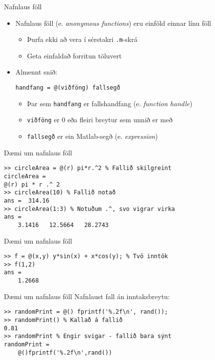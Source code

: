 \documentclass{beamer}
\begin{document}
\begin{frame}[fragile]{Nafnlaus föll}
\begin{itemize}
 \item Nafnlaus föll (e. \emph{anonymous functions}) eru einföld einnar línu föll
 \begin{itemize}
  \item Þurfa ekki að vera í sérstakri \texttt{.m}-skrá
  \item Geta einfaldað forritun töluvert
 \end{itemize}
 \item Almennt snið:
\begin{verbatim}
handfang = @(viðföng) fallsegð
\end{verbatim}
 \begin{itemize}
  \item Þar sem \texttt{handfang} er fallshandfang (e. \emph{function handle})
  \item \texttt{viðföng} er 0 eða fleiri breytur sem unnið er með
  \item \texttt{fallsegð} er ein Matlab-segð (e. \emph{expression})
 \end{itemize}
\end{itemize}
\end{frame}

\begin{frame}[fragile]{Dæmi um nafnlaus föll}
\begin{verbatim}
>> circleArea = @(r) pi*r.^2 % Fallið skilgreint
circleArea =
@(r) pi * r .^ 2
>> circleArea(10) % Fallið notað
ans =  314.16
>> circleArea(1:3) % Notuðum .^, svo vigrar virka
ans =
    3.1416   12.5664   28.2743
\end{verbatim}
\end{frame}

\begin{frame}[fragile]{Dæmi um nafnlaus föll}
\begin{verbatim}
>> f = @(x,y) y*sin(x) + x*cos(y); % Tvö inntök
>> f(1,2)
ans =
    1.2668
\end{verbatim}
\end{frame}

\begin{frame}[fragile]{Dæmi um nafnlaus föll}
Nafnlaust fall án inntaksbreytu:
\begin{verbatim}
>> randomPrint = @() fprintf('%.2f\n', rand());
>> randomPrint() % Kallað á fallið
0.81
>> randomPrint % Engir svigar - fallið bara sýnt
randomPrint = 
    @()fprintf('%.2f\n',rand())
\end{verbatim}
\end{frame}
\end{document}
